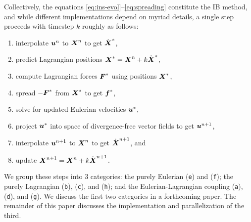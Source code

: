 Collectively, the equations \eqref{eq:ins-evol}--\eqref{eq:spreading} constitute the
IB method, and while different implementations depend on myriad details, a single step
proceeds with timestep $k$ roughly as follows:
\begin{enumerate}[label=(\texttt{\alph*})]
    \item interpolate $\boldsymbol{u}^n$ to $\boldsymbol{X}^n$ to get $\dot{\boldsymbol{X}}^\ast$,
    \item predict Lagrangian positions $\boldsymbol{X}^\ast = \boldsymbol{X}^n + k\dot{\boldsymbol{X}}^\ast$,
    \item compute Lagrangian forces $\boldsymbol{F}^\ast$ using positions $\boldsymbol{X}^\ast$,
    \item spread $-\boldsymbol{F}^\ast$ from $\boldsymbol{X}^\ast$ to get $\boldsymbol{f}^\ast$,
    \item solve for updated Eulerian velocities $\boldsymbol{u}^\ast$,
    \item project $\boldsymbol{u}^\ast$ into space of divergence-free vector fields to get
        $\boldsymbol{u}^{n+1}$,
    \item interpolate $\boldsymbol{u}^{n+1}$ to $\boldsymbol{X}^n$ to get $\dot{\boldsymbol{X}}^{n+1}$, and
    \item update $\boldsymbol{X}^{n+1} = \boldsymbol{X}^n + k \dot{\boldsymbol{X}}^{n+1}$.
\end{enumerate}
We group these steps into 3 categories: the purely Eulerian (\texttt{e}) and
(\texttt{f}); the purely Lagrangian (\texttt{b}), (\texttt{c}), and (\texttt{h}); and the
Eulerian-Lagrangian coupling (\texttt{a}), (\texttt{d}), and (\texttt{g}). We discuss the
first two categories in a forthcoming paper. The remainder of this paper discusses the
implementation and parallelization of the third.

